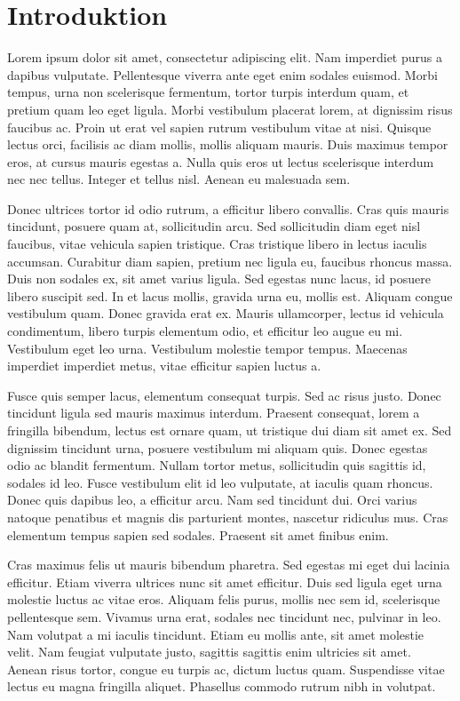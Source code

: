 
\section{Introduktion}

Lorem ipsum dolor sit amet, consectetur adipiscing elit. Nam imperdiet purus a dapibus vulputate. Pellentesque viverra ante eget enim sodales euismod. Morbi tempus, urna non scelerisque fermentum, tortor turpis interdum quam, et pretium quam leo eget ligula. Morbi vestibulum placerat lorem, at dignissim risus faucibus ac. Proin ut erat vel sapien rutrum vestibulum vitae at nisi. Quisque lectus orci, facilisis ac diam mollis, mollis aliquam mauris. Duis maximus tempor eros, at cursus mauris egestas a. Nulla quis eros ut lectus scelerisque interdum nec nec tellus. Integer et tellus nisl. Aenean eu malesuada sem.

Donec ultrices tortor id odio rutrum, a efficitur libero convallis. Cras quis mauris tincidunt, posuere quam at, sollicitudin arcu. Sed sollicitudin diam eget nisl faucibus, vitae vehicula sapien tristique. Cras tristique libero in lectus iaculis accumsan. Curabitur diam sapien, pretium nec ligula eu, faucibus rhoncus massa. Duis non sodales ex, sit amet varius ligula. Sed egestas nunc lacus, id posuere libero suscipit sed. In et lacus mollis, gravida urna eu, mollis est. Aliquam congue vestibulum quam. Donec gravida erat ex. Mauris ullamcorper, lectus id vehicula condimentum, libero turpis elementum odio, et efficitur leo augue eu mi. Vestibulum eget leo urna. Vestibulum molestie tempor tempus. Maecenas imperdiet imperdiet metus, vitae efficitur sapien luctus a.

Fusce quis semper lacus, elementum consequat turpis. Sed ac risus justo. Donec tincidunt ligula sed mauris maximus interdum. Praesent consequat, lorem a fringilla bibendum, lectus est ornare quam, ut tristique dui diam sit amet ex. Sed dignissim tincidunt urna, posuere vestibulum mi aliquam quis. Donec egestas odio ac blandit fermentum. Nullam tortor metus, sollicitudin quis sagittis id, sodales id leo. Fusce vestibulum elit id leo vulputate, at iaculis quam rhoncus. Donec quis dapibus leo, a efficitur arcu. Nam sed tincidunt dui. Orci varius natoque penatibus et magnis dis parturient montes, nascetur ridiculus mus. Cras elementum tempus sapien sed sodales. Praesent sit amet finibus enim.

Cras maximus felis ut mauris bibendum pharetra. Sed egestas mi eget dui lacinia efficitur. Etiam viverra ultrices nunc sit amet efficitur. Duis sed ligula eget urna molestie luctus ac vitae eros. Aliquam felis purus, mollis nec sem id, scelerisque pellentesque sem. Vivamus urna erat, sodales nec tincidunt nec, pulvinar in leo. Nam volutpat a mi iaculis tincidunt. Etiam eu mollis ante, sit amet molestie velit. Nam feugiat vulputate justo, sagittis sagittis enim ultricies sit amet. Aenean risus tortor, congue eu turpis ac, dictum luctus quam. Suspendisse vitae lectus eu magna fringilla aliquet. Phasellus commodo rutrum nibh in volutpat.

